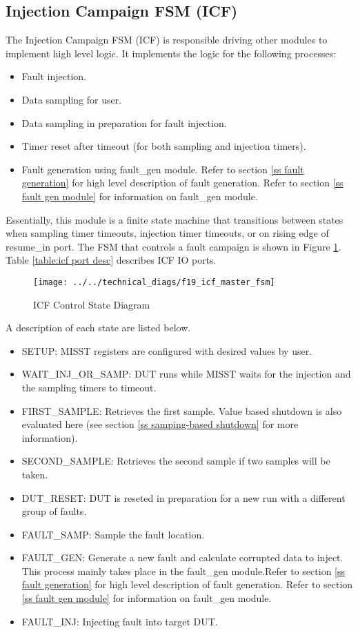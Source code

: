 \documentclass[]{report}
\begin{document}
\clearpage
\subsection{Injection Campaign FSM (ICF)}
\label{ss icf}

The Injection Campaign FSM (ICF) is responsible driving other modules to implement high level logic. It implements the logic for the following processes:
\begin{itemize}
	\item Fault injection.
	\item Data sampling for user.
	\item Data sampling in preparation for fault injection.
	\item Timer reset after timeout (for both sampling and injection timers).
	\item Fault generation using fault\_gen module. Refer to section \ref{ss fault generation} for high level description of fault generation. Refer to section \ref{ss fault gen module} for information on fault\_gen module.
\end{itemize}

Essentially, this module is a finite state machine that transitions between states when sampling timer timeouts, injection timer timeouts, or on rising edge of resume\_in port. The FSM that controls a fault campaign is shown in Figure \ref{fig:ic fmaster fsm}. Table \ref{table:icf port desc} describes ICF IO ports.

\begin{figure}[h]
	\centering
	\texttt{[image: ../../technical\_diags/f19\_icf\_master\_fsm]}
	\caption{ICF Control State Diagram}
	\label{fig:ic fmaster fsm}
\end{figure}

A description of each state are listed below.
\begin{itemize}
	\item SETUP: MISST registers are configured with desired values by user.
	\item WAIT\_INJ\_OR\_SAMP: DUT runs while MISST waits for the injection and the sampling timers to timeout. 
	\item FIRST\_SAMPLE: Retrieves the first sample. Value based shutdown is also evaluated here (see section \ref{ss samping-based shutdown} for more information).
	\item SECOND\_SAMPLE: Retrieves the second sample if two samples will be taken.
	\item DUT\_RESET: DUT is reseted in preparation for a new run with a different group of faults.
	\item FAULT\_SAMP: Sample the fault location.
	\item FAULT\_GEN: Generate a new fault and calculate corrupted data to inject. This process mainly takes place in the fault\_gen module.Refer to section \ref{ss fault generation} for high level description of fault generation. Refer to section \ref{ss fault gen module} for information on fault\_gen module.
	\item FAULT\_INJ: Injecting fault into target DUT.
\end{itemize}
\end{document}
